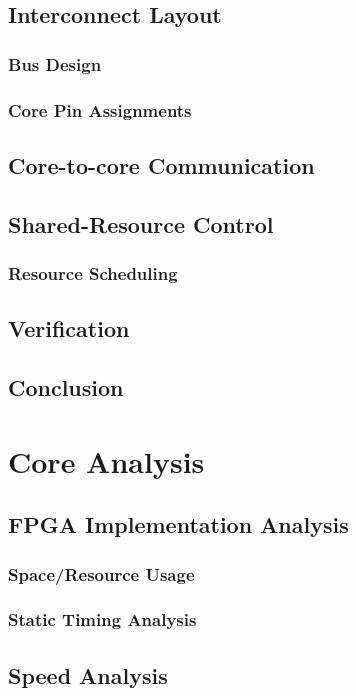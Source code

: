 \documentclass[11pt,a4paper]{report}
\begin{document}
{    \section{Interconnect Layout}
        \subsection{Bus Design}
        \subsection{Core Pin Assignments}
    \section{Core-to-core Communication}
    \section{Shared-Resource Control}
        \subsection{Resource Scheduling}
    \section{Verification}
    \section{Conclusion}

\chapter{Core Analysis}
{\hypersetup{linkcolor=black}
\startcontents[chapters]
}
    \section{FPGA Implementation Analysis}
        \subsection{Space/Resource Usage}
        \subsection{Static Timing Analysis}
    \section{Speed Analysis}
}
\end{document}
